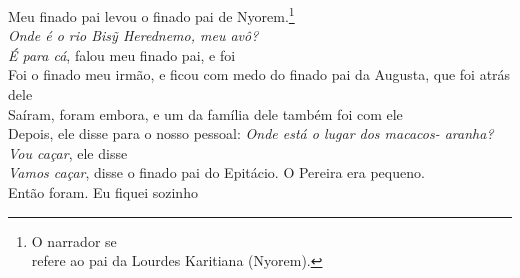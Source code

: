 \bigskip

\begin{linenumbers}
 
\noindent   Meu finado pai levou o finado pai de Nyorem.\footnote{O narrador se\\
   refere ao pai da Lourdes Karitiana (Nyorem).}\\
  \textit{Onde é o rio \textit{Bisỹ Herednemo}, meu avô?}\\
  \textit{É para cá}, falou meu finado pai, e foi\\
  Foi o finado meu irmão, e ficou com medo do finado pai da Augusta, que foi atrás dele\\
  Saíram, foram embora, e um da família dele também foi com ele\\
  Depois, ele disse para o nosso pessoal: \textit{Onde está o lugar dos macacos- aranha?}\\
  \textit{Vou caçar}, ele disse\\
  \textit{Vamos caçar}, disse o finado pai do Epitácio. O Pereira era pequeno.\\
  Então foram. Eu fiquei sozinho
 
\end{linenumbers}

\bigskip

